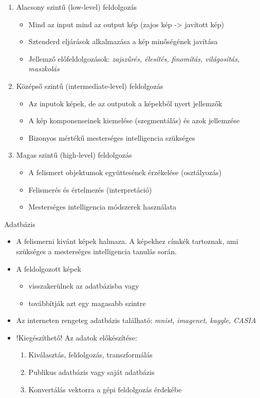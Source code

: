 \begin{enumerate}
\item Alacsony szintű (low-level) feldolgozás
	\begin{itemize}
	\item Mind az input mind az output kép (zajos kép -> javított kép)
	\item Sztenderd eljárások alkalmazása a kép minőségének 			javítása
	\item Jellemző előfeldolgozások: \textit{zajszűrés, 			élesítés, finomítás, világosítás, maszkolás}
	\end{itemize}
\item Középső szintű (intermediate-level) feldolgozás
	\begin{itemize}
	\item Az inputok képek, de az outputok a képekből nyert jellemzők 
	\item A kép komponenseinek kiemelése (szegmentálás) és azok jellemzése
	\item Bizonyos mértékű mesterséges intelligencia szükséges
	\end{itemize}
\item Magas szintű (high-level) feldolgozás
	\begin{itemize}
	\item A felismert objektumok együttesének érzékelése (osztályozás)
	\item Felismerés és értelmezés (interpretáció)
	\item Mesterséges intelligencia módszerek használata
	\end{itemize}
\end{enumerate}

Adatbázis
\begin{itemize}
\item A felismerni kivánt képek halmaza. A képekhez címkék tartoznak, ami szükséges a mesterséges intelligencia tanulás során.
\item A feldolgozott képek
	\begin{itemize}
	\item visszakerülnek az adatbázisba vagy
	\item továbbítják azt egy magasabb szintre
	\end{itemize}	  
\item Az interneten rengeteg adatbázis található: \textit{mnist, imagenet, kaggle, CASIA}
\item !Kiegészíthető! Az adatok előkészítése:
	\begin{enumerate}
	\item Kiválasztás, feldolgozás, transzformálás
	\item Publikus adatbázis vagy saját adatbázis
	\item Konvertálás vektorra a gépi feldolgozás érdekébe
	\end{enumerate}
\end{itemize}

